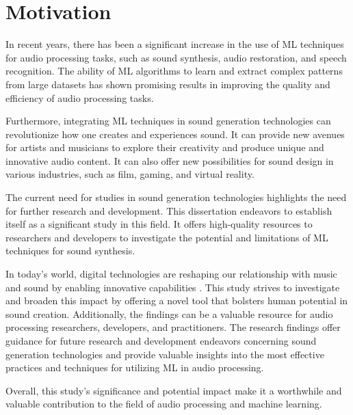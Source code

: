 \section{Motivation} \label{sec:motivation}

In recent years, there has been a significant increase in the use of \ac{ML} techniques for audio processing tasks, such as sound synthesis, audio restoration, and speech recognition. The ability of \ac{ML} algorithms to learn and extract complex patterns from large datasets has shown promising results in improving the quality and efficiency of audio processing tasks.

Furthermore, integrating \ac{ML} techniques in sound generation technologies can revolutionize how one creates and experiences sound. It can provide new avenues for artists and musicians to explore their creativity and produce unique and innovative audio content. It can also offer new possibilities for sound design in various industries, such as film, gaming, and virtual reality.

The current need for studies in sound generation technologies highlights the need for further research and development. This dissertation endeavors to establish itself as a significant study in this field. It offers high-quality resources to researchers and developers to investigate the potential and limitations of \ac{ML} techniques for sound synthesis.

In today's world, digital technologies are reshaping our relationship with music and sound by enabling innovative capabilities \cite{tahiroglu_-terity_2020}. This study strives to investigate and broaden this impact by offering a novel tool that bolsters human potential in sound creation. Additionally, the findings can be a valuable resource for audio processing researchers, developers, and practitioners. The research findings offer guidance for future research and development endeavors concerning sound generation technologies and provide valuable insights into the most effective practices and techniques for utilizing \ac{ML} in audio processing.

Overall, this study's significance and potential impact make it a worthwhile and valuable contribution to the field of audio processing and machine learning.